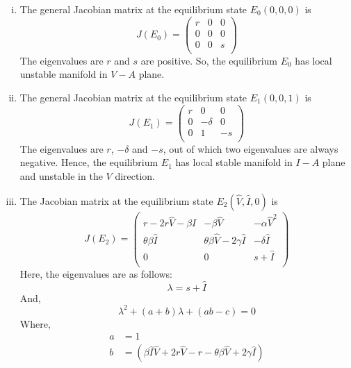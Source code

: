 \documentclass[12pt]{article}
\numberwithin{equation}{section}
\begin{document}
\begin{enumerate}[i).]
\item The general Jacobian matrix at the equilibrium state $E_0(0,0,0)$ is
\begin{equation}\label{sec3:e29}
J(E_0)=
\left({\begin{matrix}
	r & 0 & 0\\
	0 & 0 & 0\\
	0 & 0 & s\\
\end{matrix}}\right)
\end{equation}
The eigenvalues are $r$ and $s$ are positive. So, the equilibrium $E_0$ has local unstable manifold in $V-A$ plane.
\item The general Jacobian matrix at the equilibrium state $E_1(0,0,1)$ is
\begin{equation}\label{sec3:e30}
J(E_1)=
\left({\begin{matrix}
	r & 0 & 0\\
	0 & -\delta & 0\\
	0 & 1 & -s\\
\end{matrix}}\right)
\end{equation}
The eigenvalues are $r$, $-\delta$ and $-s$, out of which two eigenvalues are always negative. Hence, the equilibrium $E_1$ has local stable manifold in $I-A$ plane and unstable in the $V$ direction.
\item The Jacobian matrix at the equilibrium state $E_2(\hat V, \hat I, 0)$ is
\begin{equation}\label{sec3:e31}
J(E_2)=
\left({\begin{matrix}
	r-2r\hat V-\beta I & -\beta \hat V & -\alpha \hat V^2\\
	\theta \beta \hat I & \theta \beta \hat V-2\gamma \hat I & -\delta \hat I\\
	0 & 0 & s+\hat I\\
\end{matrix}}\right)
\end{equation}
Here, the eigenvalues are as follows:
\begin{equation}
\lambda = s+\hat I
\end{equation}
And,
\begin{equation}
\lambda^2 + (a+b)\lambda + (ab-c) = 0
\end{equation}
Where,
\begin{align}
a &= 1\\
b &= (\beta \hat I \hat V + 2r\hat V - r -\theta \beta \hat V + 2\gamma \hat I)\\

\end{align}
\end{enumerate}
\end{document}
